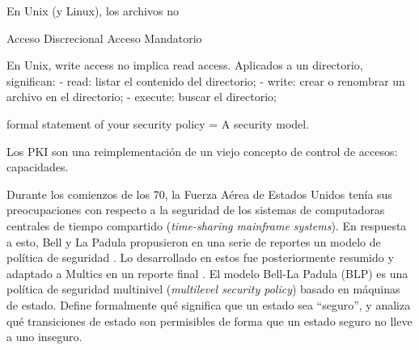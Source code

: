 \documentclass[main.tex]{subfiles}
\begin{document}
En Unix (y Linux), los archivos no


Acceso Discrecional
Acceso Mandatorio

En Unix, write access no implica read access. Aplicados a un directorio,
significan:
- read: listar el contenido del directorio;
- write: crear o renombrar un archivo en el directorio;
- execute: buscar el directorio;

formal statement of your security policy = A security model.

Los PKI son una reimplementación de un viejo concepto de control de accesos:
capacidades.

\fi


Durante los comienzos de los 70, la Fuerza Aérea de Estados Unidos tenía sus
preocupaciones con respecto a la seguridad de los sistemas de computadoras
centrales de tiempo compartido (\textit{time-sharing mainframe systems}). 
En respuesta a esto,  Bell y La Padula propusieron en una serie de reportes un
modelo de política de seguridad \cite{BLP73, BLP73b, Bell74}. Lo desarrollado en estos fue
posteriormente resumido y adaptado a Multics en un reporte final \cite{BLP76}.
El modelo Bell-La Padula (BLP) es una política de seguridad multinivel
(\textit{multilevel security policy}) basado en máquinas de estado.  Define
formalmente qué significa que un estado sea ``seguro'', y analiza qué
transiciones de estado son permisibles de forma que un estado seguro no lleve a
uno inseguro. 
\end{document}
